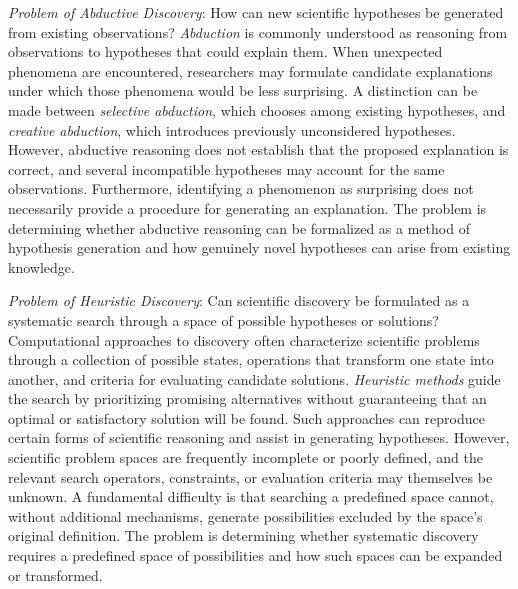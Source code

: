 \emph{Problem of Abductive Discovery}: How can new scientific hypotheses be generated from existing observations? \emph{Abduction} is commonly understood as reasoning from observations to hypotheses that could explain them. When unexpected phenomena are encountered, researchers may formulate candidate explanations under which those phenomena would be less surprising. A distinction can be made between \emph{selective abduction}, which chooses among existing hypotheses, and \emph{creative abduction}, which introduces previously unconsidered hypotheses. However, abductive reasoning does not establish that the proposed explanation is correct, and several incompatible hypotheses may account for the same observations. Furthermore, identifying a phenomenon as surprising does not necessarily provide a procedure for generating an explanation. The problem is determining whether abductive reasoning can be formalized as a method of hypothesis generation and how genuinely novel hypotheses can arise from existing knowledge.

\emph{Problem of Heuristic Discovery}: Can scientific discovery be formulated as a systematic search through a space of possible hypotheses or solutions? Computational approaches to discovery often characterize scientific problems through a collection of possible states, operations that transform one state into another, and criteria for evaluating candidate solutions. \emph{Heuristic methods} guide the search by prioritizing promising alternatives without guaranteeing that an optimal or satisfactory solution will be found. Such approaches can reproduce certain forms of scientific reasoning and assist in generating hypotheses. However, scientific problem spaces are frequently incomplete or poorly defined, and the relevant search operators, constraints, or evaluation criteria may themselves be unknown. A fundamental difficulty is that searching a predefined space cannot, without additional mechanisms, generate possibilities excluded by the space's original definition. The problem is determining whether systematic discovery requires a predefined space of possibilities and how such spaces can be expanded or transformed.

